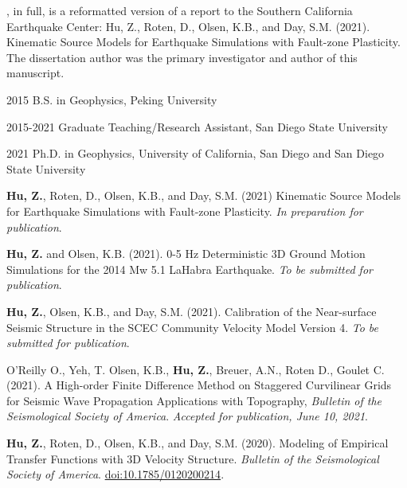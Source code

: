 \begin{frontmatter}
\begin{acknowledgements}
        , in full, is a reformatted version of a report to the Southern California Earthquake Center: Hu, Z., Roten, D., Olsen, K.B., and Day, S.M. (2021). Kinematic Source Models for Earthquake Simulations with Fault-zone Plasticity. The dissertation author was the primary investigator and author of this manuscript.
        

    \end{acknowledgements}


    \begin{vitapage}
        \begin{vita}
            \item[2015] B.S. in Geophysics, Peking University
            \item[2015-2021] Graduate Teaching/Research Assistant, San Diego State University
            \item[2021] Ph.D. in Geophysics, University of California, San Diego and San Diego State University
        \end{vita}
        \begin{publications}
            \item \textbf{Hu, Z.}, Roten, D., Olsen, K.B., and Day, S.M. (2021) Kinematic Source Models for Earthquake Simulations with Fault-zone Plasticity. \emph{In preparation for publication}.
            \item \textbf{Hu, Z.} and Olsen, K.B. (2021). 0-5 Hz Deterministic 3D Ground Motion Simulations for the 2014 Mw 5.1 LaHabra Earthquake. \emph{To be submitted for publication}.
            \item \textbf{Hu, Z.}, Olsen, K.B., and Day, S.M. (2021). Calibration of the Near-surface Seismic Structure in the SCEC Community Velocity Model Version 4. \emph{To be submitted for publication}.
            \item O'Reilly O., Yeh, T. Olsen, K.B., \textbf{Hu, Z.}, Breuer, A.N., Roten D., Goulet C. (2021). A High-order Finite Difference Method on Staggered Curvilinear Grids for Seismic Wave Propagation Applications with Topography, \emph{Bulletin of the Seismological Society of America}. \emph{Accepted for publication, June 10, 2021}.
            \item \textbf{Hu, Z.}, Roten, D., Olsen, K.B., and Day, S.M. (2020). Modeling of Empirical Transfer Functions with 3D Velocity Structure. \emph{Bulletin of the Seismological Society of America}. \url{doi:10.1785/0120200214}.



\end{publications}
\end{vitapage}
\end{frontmatter}
